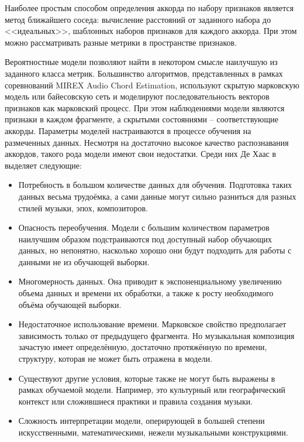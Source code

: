 Наиболее простым способом определения аккорда по набору признаков является метод
ближайшего соседа: вычисление расстояний от заданного набора до <<идеальных>>,
шаблонных наборов признаков для каждого аккорда. При этом можно рассматривать
разные метрики в пространстве признаков.

Вероятностные модели позволяют найти в некотором смысле наилучшую из заданного
класса метрик. Большинство алгоритмов, представленных в рамках соревнований
MIREX Audio Chord Estimation, используют скрытую марковскую модель или
байесовскую сеть и моделируют последовательность векторов признаков как
марковский процесс. При этом наблюдениями модели являются признаки в каждом
фрагменте, а скрытыми состояниями -- соответствующие аккорды. Параметры моделей
настраиваются в процессе обучения на размеченных данных. Несмотря на достаточно
высокое качество распознавания аккордов, такого рода модели имеют свои
недостатки. Среди них Де Хаас в \cite{DeHaas2012} выделяет следующие:
\begin{itemize}
  \item Потребность в большом количестве данных для обучения. Подготовка таких
  данных весьма трудоёмка, а сами данные могут сильно разниться для разных
  стилей музыки, эпох, композиторов.
  
  \item Опасность переобучения. Модели с большим количеством параметров
  наилучшим образом подстраиваются под доступный набор обучающих данных, но
  непонятно, насколько хорошо они будут подходить для работы с данными не из
  обучающей выборки.
  
  \item Многомерность данных. Она приводит к экспоненциальному увеличению объема
  данных и времени их обработки, а также к росту необходимого объёма обучающей
  выборки.
  
  \item Недостаточное использование времени. Марковское свойство предполагает
  зависимость только от предыдущего фрагмента. Но музыкальная композиция
  зачастую имеет определённую, достаточно протяжённую по времени, структуру,
  которая не может быть отражена в модели.
  
  \item Существуют другие условия, которые также не могут быть выражены в рамках
  обучаемой модели. Например, это культурный или географический контекст или
  сложившиеся практики и правила создания музыки.
  
  \item Сложность интерпретации модели, оперирующей в большей степени
  искусственными, математическими, нежели музыкальными конструкциями.
\end{itemize}

